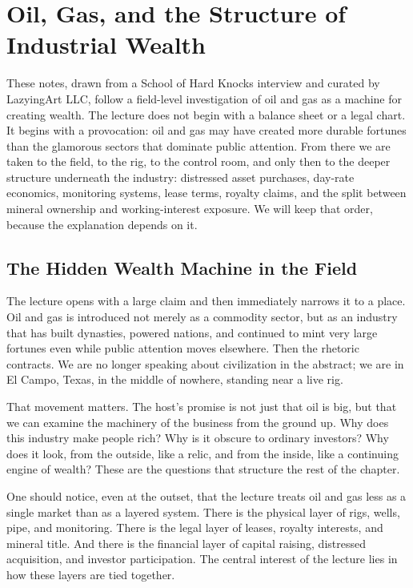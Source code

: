 \chapter{Oil, Gas, and the Structure of Industrial Wealth}

These notes, drawn from a School of Hard Knocks interview and curated by LazyingArt LLC, follow a field-level investigation of oil and gas as a machine for creating wealth. The lecture does not begin with a balance sheet or a legal chart. It begins with a provocation: oil and gas may have created more durable fortunes than the glamorous sectors that dominate public attention. From there we are taken to the field, to the rig, to the control room, and only then to the deeper structure underneath the industry: distressed asset purchases, day-rate economics, monitoring systems, lease terms, royalty claims, and the split between mineral ownership and working-interest exposure. We will keep that order, because the explanation depends on it.

\section{The Hidden Wealth Machine in the Field}

The lecture opens with a large claim and then immediately narrows it to a place. Oil and gas is introduced not merely as a commodity sector, but as an industry that has built dynasties, powered nations, and continued to mint very large fortunes even while public attention moves elsewhere. Then the rhetoric contracts. We are no longer speaking about civilization in the abstract; we are in El Campo, Texas, in the middle of nowhere, standing near a live rig.

That movement matters. The host's promise is not just that oil is big, but that we can examine the machinery of the business from the ground up. Why does this industry make people rich? Why is it obscure to ordinary investors? Why does it look, from the outside, like a relic, and from the inside, like a continuing engine of wealth? These are the questions that structure the rest of the chapter.

One should notice, even at the outset, that the lecture treats oil and gas less as a single market than as a layered system. There is the physical layer of rigs, wells, pipe, and monitoring. There is the legal layer of leases, royalty interests, and mineral title. And there is the financial layer of capital raising, distressed acquisition, and investor participation. The central interest of the lecture lies in how these layers are tied together.

